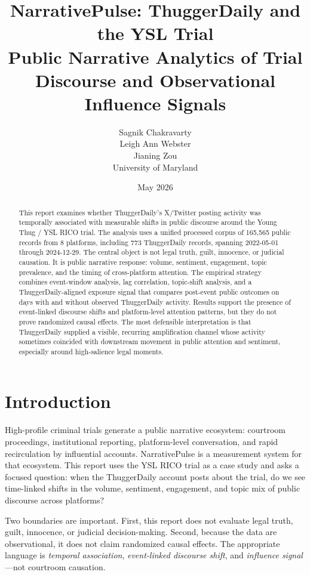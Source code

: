 \documentclass[12pt]{article}
\title{\textbf{NarrativePulse: ThuggerDaily and the YSL Trial}\\
\large Public Narrative Analytics of Trial Discourse and Observational Influence Signals}
\author{Sagnik Chakravarty \\ Leigh Ann Webster \\ Jianing Zou \\ \small University of Maryland}
\date{May 2026}
\begin{document}
\maketitle
\begin{abstract}
This report examines whether ThuggerDaily's X/Twitter posting activity was temporally associated with measurable shifts in public discourse around the Young Thug / YSL RICO trial. The analysis uses a unified processed corpus of 165,565 public records from 8 platforms, including 773 ThuggerDaily records, spanning 2022-05-01 through 2024-12-29. The central object is not legal truth, guilt, innocence, or judicial causation. It is public narrative response: volume, sentiment, engagement, topic prevalence, and the timing of cross-platform attention. The empirical strategy combines event-window analysis, lag correlation, topic-shift analysis, and a ThuggerDaily-aligned exposure signal that compares post-event public outcomes on days with and without observed ThuggerDaily activity. Results support the presence of event-linked discourse shifts and platform-level attention patterns, but they do not prove randomized causal effects. The most defensible interpretation is that ThuggerDaily supplied a visible, recurring amplification channel whose activity sometimes coincided with downstream movement in public attention and sentiment, especially around high-salience legal moments.
\end{abstract}

\newpage
\tableofcontents
\newpage
\listoffigures
\newpage
\listoftables
\newpage

\section{Introduction}
High-profile criminal trials generate a public narrative ecosystem: courtroom proceedings, institutional reporting, platform-level conversation, and rapid recirculation by influential accounts. NarrativePulse is a measurement system for that ecosystem. This report uses the YSL RICO trial as a case study and asks a focused question: when the ThuggerDaily account posts about the trial, do we see time-linked shifts in the volume, sentiment, engagement, and topic mix of public discourse across platforms?

Two boundaries are important. First, this report does not evaluate legal truth, guilt, innocence, or judicial decision-making. Second, because the data are observational, it does not claim randomized causal effects. The appropriate language is \emph{temporal association}, \emph{event-linked discourse shift}, and \emph{influence signal}---not courtroom causation.
\end{document}
